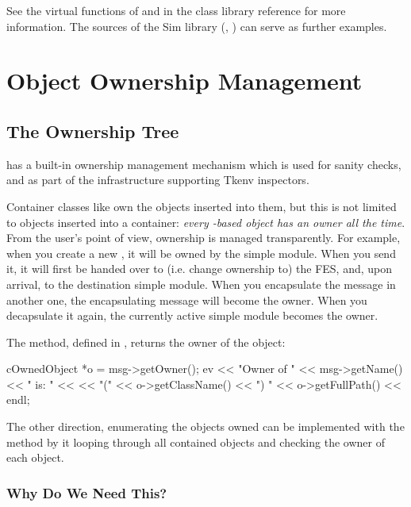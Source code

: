 See the virtual functions of  and 
in the class library reference for more information. The sources of the
Sim library (, ) can serve as further examples.



\section{Object Ownership Management}
\label{sec:ch-sim-lib:ownership-management}

\subsection{The Ownership Tree}

{\opp} has a built-in ownership management mechanism which
is used for sanity checks, and as part of the infrastructure
supporting Tkenv inspectors.

Container classes like  own the objects inserted
into them, but this is not limited to objects inserted into a container:
\textit{every -based object has an owner all the time}.
From the user's point of view, ownership is managed transparently.
For example, when you create a new ,
it will be owned by the simple module. When you send it, it will
first be handed over to (i.e. change ownership to) the FES, and,
upon arrival, to the destination simple module. When you encapsulate
the message in another one, the encapsulating message will become
the owner. When you decapsulate it again, the currently active
simple module becomes the owner.

The  method, defined in , returns the
owner of the object:

\begin{cpp}
cOwnedObject *o = msg->getOwner();
ev << "Owner of " << msg->getName() << " is: " <<
   << "(" << o->getClassName() << ") " << o->getFullPath() << endl;
\end{cpp}

The other direction, enumerating the objects owned can be implemented with
the  method by it looping through all
contained objects and checking the owner of each object.

\subsubsection{Why Do We Need This?}

